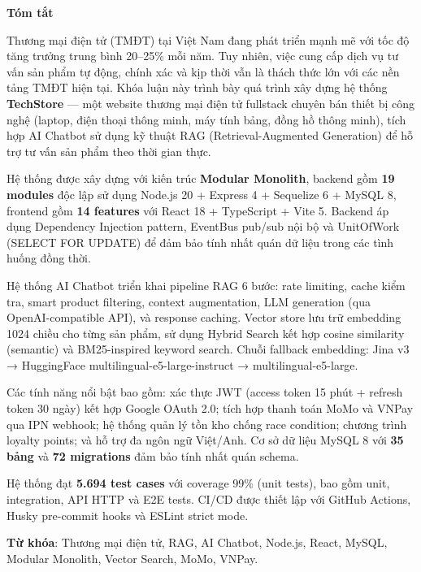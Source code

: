 \begin{center}
\textbf{\large{Tóm tắt}}
\end{center}

\begin{small}

Thương mại điện tử (TMĐT) tại Việt Nam đang phát triển mạnh mẽ với tốc độ tăng trưởng trung bình 20--25\% mỗi năm. Tuy nhiên, việc cung cấp dịch vụ tư vấn sản phẩm tự động, chính xác và kịp thời vẫn là thách thức lớn với các nền tảng TMĐT hiện tại. Khóa luận này trình bày quá trình xây dựng hệ thống \textbf{TechStore} --- một website thương mại điện tử fullstack chuyên bán thiết bị công nghệ (laptop, điện thoại thông minh, máy tính bảng, đồng hồ thông minh), tích hợp AI Chatbot sử dụng kỹ thuật RAG (Retrieval-Augmented Generation) để hỗ trợ tư vấn sản phẩm theo thời gian thực.

Hệ thống được xây dựng với kiến trúc \textbf{Modular Monolith}, backend gồm \textbf{19 modules} độc lập sử dụng Node.js 20 + Express 4 + Sequelize 6 + MySQL 8, frontend gồm \textbf{14 features} với React 18 + TypeScript + Vite 5. Backend áp dụng Dependency Injection pattern, EventBus pub/sub nội bộ và UnitOfWork (SELECT FOR UPDATE) để đảm bảo tính nhất quán dữ liệu trong các tình huống đồng thời.

Hệ thống AI Chatbot triển khai pipeline RAG 6 bước: rate limiting, cache kiểm tra, smart product filtering, context augmentation, LLM generation (qua OpenAI-compatible API), và response caching. Vector store lưu trữ embedding 1024 chiều cho từng sản phẩm, sử dụng Hybrid Search kết hợp cosine similarity (semantic) và BM25-inspired keyword search. Chuỗi fallback embedding: Jina v3 → HuggingFace multilingual-e5-large-instruct → multilingual-e5-large.

Các tính năng nổi bật bao gồm: xác thực JWT (access token 15 phút + refresh token 30 ngày) kết hợp Google OAuth 2.0; tích hợp thanh toán MoMo và VNPay qua IPN webhook; hệ thống quản lý tồn kho chống race condition; chương trình loyalty points; và hỗ trợ đa ngôn ngữ Việt/Anh. Cơ sở dữ liệu MySQL 8 với \textbf{35 bảng} và \textbf{72 migrations} đảm bảo tính nhất quán schema.

Hệ thống đạt \textbf{5.694 test cases} với coverage 99\% (unit tests), bao gồm unit, integration, API HTTP và E2E tests. CI/CD được thiết lập với GitHub Actions, Husky pre-commit hooks và ESLint strict mode.

\vspace*{0.5cm}
\textbf{Từ khóa}: Thương mại điện tử, RAG, AI Chatbot, Node.js, React, MySQL, Modular Monolith, Vector Search, MoMo, VNPay.

\end{small}
